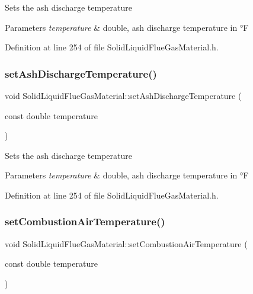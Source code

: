 Sets the ash discharge temperature 
\begin{DoxyParams}{Parameters}
{\em temperature} & double, ash discharge temperature in °F \\
\hline
\end{DoxyParams}


Definition at line 254 of file Solid\+Liquid\+Flue\+Gas\+Material.\+h.

\mbox{\label{class_solid_liquid_flue_gas_material_ad29543a88737c3d051c7d824287bc791}} 
\subsubsection{\texorpdfstring{set\+Ash\+Discharge\+Temperature()}{setAshDischargeTemperature()}\hspace{0.1cm}{\footnotesize\ttfamily [3/3]}}
{\footnotesize\ttfamily void Solid\+Liquid\+Flue\+Gas\+Material\+::set\+Ash\+Discharge\+Temperature (\begin{DoxyParamCaption}\item[{const double}]{temperature }\end{DoxyParamCaption})\hspace{0.3cm}{\ttfamily [inline]}}

Sets the ash discharge temperature 
\begin{DoxyParams}{Parameters}
{\em temperature} & double, ash discharge temperature in °F \\
\hline
\end{DoxyParams}


Definition at line 254 of file Solid\+Liquid\+Flue\+Gas\+Material.\+h.

\mbox{\label{class_solid_liquid_flue_gas_material_a626dfbc9ba87abff99e5c5a8204d69c6}} 
\subsubsection{\texorpdfstring{set\+Combustion\+Air\+Temperature()}{setCombustionAirTemperature()}\hspace{0.1cm}{\footnotesize\ttfamily [1/3]}}
{\footnotesize\ttfamily void Solid\+Liquid\+Flue\+Gas\+Material\+::set\+Combustion\+Air\+Temperature (\begin{DoxyParamCaption}\item[{const double}]{temperature }\end{DoxyParamCaption})\hspace{0.3cm}{\ttfamily [inline]}}

